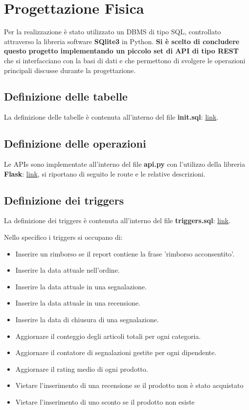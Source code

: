 \section{Progettazione Fisica}

Per la realizzazione è stato utilizzato un DBMS di tipo SQL, controllato attraverso la libreria software \textbf{SQlite3} in Python. \textbf{Si è scelto di concludere questo progetto implementando un piccolo set di API di tipo REST} che si interfacciano con la basi di dati e che permettono di svolgere le operazioni principali discusse durante la progettazione. 

\subsection{Definizione delle tabelle}
La definizione delle tabelle è contenuta all'interno del file \textbf{init.sql}: \href{https://github.com/krosspile/ecommerce_database/blob/master/src/database/init.sql}{link}.

\subsection{Definizione delle operazioni}
Le APIs sono implementate all'interno del file \textbf{api.py} con l'utilizzo della libreria \textbf{Flask}: \href{https://github.com/krosspile/ecommerce_database/blob/master/src/api.py}{link}, si riportano di seguito le route e le relative descrizioni. 



\subsection{Definizione dei triggers}

La definizione dei triggers è contenuta all'interno del file \textbf{triggers.sql}: \href{https://github.com/krosspile/ecommerce_database/blob/master/src/database/triggers.sql}{link}.

Nello specifico i triggers si occupano di:\\
\begin{itemize}
    \item Inserire un rimborso se il report contiene la frase 'rimborso acconsentito'.
    \item Inserire la data attuale nell'ordine.
    \item Inserire la data attuale in una segnalazione.
    \item Inserire la data attuale in una recensione.
    \item Inserire la data di chiusura di una segnalazione.
    \item Aggiornare il conteggio degli articoli totali per ogni categoria.
    \item Aggiornare il contatore di segnalazioni gestite per ogni dipendente.
    \item Aggiornare il rating medio di ogni prodotto.
    \item Vietare l'inserimento di una recensione se il prodotto non è stato acquistato
    \item Vietare l'inserimento di uno sconto se il prodotto non esiste
\end{itemize}

